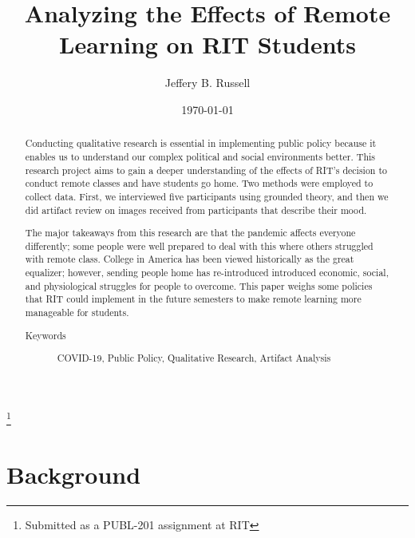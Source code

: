 \documentclass[12pt,
 reprint,
nofootinbib,
 amsmath,amssymb,
 aps,
floatfix,
]{revtex4-2}
\begin{document}

\title{Analyzing the Effects of Remote Learning on RIT Students}
\thanks{Submitted as a PUBL-201 assignment at RIT}%

\author{Jeffery B. Russell}
%

\date{\today}%




\begin{abstract}
Conducting qualitative research is essential in implementing public policy because it enables us to understand our complex political and social environments better.
This research project aims to gain a deeper understanding of the effects of RIT's decision to conduct remote classes and have students go home. Two methods were employed to collect data. First, we interviewed five participants using grounded theory, and then we did artifact review on images received from participants that describe their mood. 

The major takeaways from this research are that the pandemic affects everyone differently; some people were well prepared to deal with this where others struggled with remote class. College in America has been viewed historically as the great equalizer; however, sending people home has re-introduced introduced economic, social, and physiological struggles for people to overcome. This paper weighs some policies that RIT could implement in the future semesters to make remote learning more manageable for students. 

\begin{description}
\item[Keywords]
COVID-19, Public Policy, Qualitative Research, Artifact Analysis
\end{description}

\end{abstract}
\maketitle





\section{Background}
\end{document}
